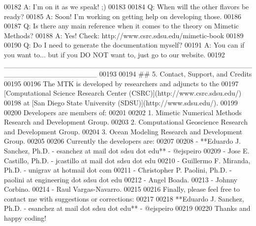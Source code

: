 \begin{DoxyCode}
00182 A: I\textcolor{stringliteral}{'m on it as we speak! ;)}
00183 \textcolor{stringliteral}{}
00184 \textcolor{stringliteral}{Q: When will the other flavors be ready?}
00185 \textcolor{stringliteral}{A: Soon! I'}m working on getting help on developing those.
00186 
00187 Q: Is there any main reference when it comes to the theory on Mimetic Methods?
00188 A: Yes! Check: http:\textcolor{comment}{//www.csrc.sdsu.edu/mimetic-book}
00189 
00190 Q: Do I need to generate the documentation myself?
00191 A: You can if you want to... but if you DO NOT want to, just go to our website.
00192     \_\_\_\_\_\_\_\_\_\_\_\_\_\_\_\_\_\_\_\_\_\_\_\_\_\_\_\_\_\_\_\_\_\_\_\_\_\_\_\_\_\_\_\_\_\_\_\_\_\_\_\_\_\_\_\_\_\_\_\_\_\_\_\_\_\_
00193 
00194 ## 5. Contact, Support, and Credits
00195 
00196 The MTK is developed by researchers and adjuncts to the
00197 [Computational Science Research Center (CSRC)](http:\textcolor{comment}{//www.csrc.sdsu.edu/)}
00198 at [San Diego State University (SDSU)](http:\textcolor{comment}{//www.sdsu.edu/).}
00199 
00200 Developers are members of:
00201 
00202 1. Mimetic Numerical Methods Research and Development Group.
00203 2. Computational Geoscience Research and Development Group.
00204 3. Ocean Modeling Research and Development Group.
00205 
00206 Currently the developers are:
00207 
00208 - **Eduardo J. Sanchez, Ph.D. - esanchez at mail dot sdsu dot edu** - @ejspeiro
00209 - Jose E. Castillo, Ph.D. - jcastillo at mail dot sdsu dot edu
00210 - Guillermo F. Miranda, Ph.D. - unigrav at hotmail dot com
00211 - Christopher P. Paolini, Ph.D. - paolini at engineering dot sdsu dot edu
00212 - Angel Boada.
00213 - Johnny Corbino.
00214 - Raul Vargas-Navarro.
00215 
00216 Finally, please feel free to contact me with suggestions or corrections:
00217 
00218 **Eduardo J. Sanchez, Ph.D. - esanchez at mail dot sdsu dot edu** - @ejspeiro
00219 
00220 Thanks and happy coding!
\end{DoxyCode}
